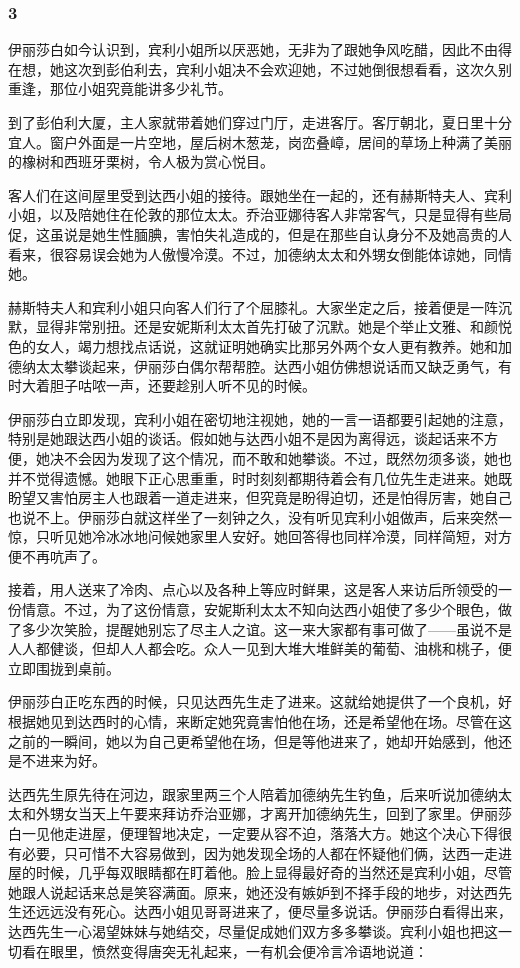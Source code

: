 \subsubsection*{3}


\par 伊丽莎白如今认识到，宾利小姐所以厌恶她，无非为了跟她争风吃醋，因此不由得在想，她这次到彭伯利去，宾利小姐决不会欢迎她，不过她倒很想看看，这次久别重逢，那位小姐究竟能讲多少礼节。
\par 到了彭伯利大厦，主人家就带着她们穿过门厅，走进客厅。客厅朝北，夏日里十分宜人。窗户外面是一片空地，屋后树木葱茏，岗峦叠嶂，居间的草场上种满了美丽的橡树和西班牙栗树，令人极为赏心悦目。
\par 客人们在这间屋里受到达西小姐的接待。跟她坐在一起的，还有赫斯特夫人、宾利小姐，以及陪她住在伦敦的那位太太。乔治亚娜待客人非常客气，只是显得有些局促，这虽说是她生性腼腆，害怕失礼造成的，但是在那些自认身分不及她高贵的人看来，很容易误会她为人傲慢冷漠。不过，加德纳太太和外甥女倒能体谅她，同情她。
\par 赫斯特夫人和宾利小姐只向客人们行了个屈膝礼。大家坐定之后，接着便是一阵沉默，显得非常别扭。还是安妮斯利太太首先打破了沉默。她是个举止文雅、和颜悦色的女人，竭力想找点话说，这就证明她确实比那另外两个女人更有教养。她和加德纳太太攀谈起来，伊丽莎白偶尔帮帮腔。达西小姐仿佛想说话而又缺乏勇气，有时大着胆子咕哝一声，还要趁别人听不见的时候。
\par 伊丽莎白立即发现，宾利小姐在密切地注视她，她的一言一语都要引起她的注意，特别是她跟达西小姐的谈话。假如她与达西小姐不是因为离得远，谈起话来不方便，她决不会因为发现了这个情况，而不敢和她攀谈。不过，既然勿须多谈，她也并不觉得遗憾。她眼下正心思重重，时时刻刻都期待着会有几位先生走进来。她既盼望又害怕房主人也跟着一道走进来，但究竟是盼得迫切，还是怕得厉害，她自己也说不上。伊丽莎白就这样坐了一刻钟之久，没有听见宾利小姐做声，后来突然一惊，只听见她冷冰冰地问候她家里人安好。她回答得也同样冷漠，同样简短，对方便不再吭声了。
\par 接着，用人送来了冷肉、点心以及各种上等应时鲜果，这是客人来访后所领受的一份情意。不过，为了这份情意，安妮斯利太太不知向达西小姐使了多少个眼色，做了多少次笑脸，提醒她别忘了尽主人之谊。这一来大家都有事可做了——虽说不是人人都健谈，但却人人都会吃。众人一见到大堆大堆鲜美的葡萄、油桃和桃子，便立即围拢到桌前。
\par 伊丽莎白正吃东西的时候，只见达西先生走了进来。这就给她提供了一个良机，好根据她见到达西时的心情，来断定她究竟害怕他在场，还是希望他在场。尽管在这之前的一瞬间，她以为自己更希望他在场，但是等他进来了，她却开始感到，他还是不进来为好。
\par 达西先生原先待在河边，跟家里两三个人陪着加德纳先生钓鱼，后来听说加德纳太太和外甥女当天上午要来拜访乔治亚娜，才离开加德纳先生，回到了家里。伊丽莎白一见他走进屋，便理智地决定，一定要从容不迫，落落大方。她这个决心下得很有必要，只可惜不大容易做到，因为她发现全场的人都在怀疑他们俩，达西一走进屋的时候，几乎每双眼睛都在盯着他。脸上显得最好奇的当然还是宾利小姐，尽管她跟人说起话来总是笑容满面。原来，她还没有嫉妒到不择手段的地步，对达西先生还远远没有死心。达西小姐见哥哥进来了，便尽量多说话。伊丽莎白看得出来，达西先生一心渴望妹妹与她结交，尽量促成她们双方多多攀谈。宾利小姐也把这一切看在眼里，愤然变得唐突无礼起来，一有机会便冷言冷语地说道：
